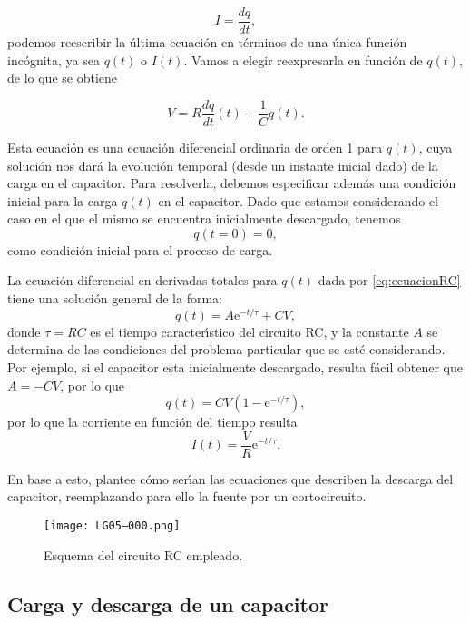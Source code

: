 \documentclass[laboratorio]{guia}
\begin{document}
$$ I = \frac{dq}{dt}, $$
podemos reescribir la \'ultima ecuaci\'on en t\'erminos de una \'unica
funci\'on inc\'ognita, ya sea $q(t)$ o $I(t)$. Vamos a elegir reexpresarla en
funci\'on de $q(t)$, de lo que se obtiene

\begin{equation}
    V = R \frac{dq}{dt}(t) + \frac{1}{C} q(t).
    \label{eq:ecuacionRC}
\end{equation}

Esta ecuaci\'on es una ecuaci\'on diferencial ordinaria de orden 1 para $q(t)$, 
cuya soluci\'on nos dar\'a la evoluci\'on temporal (desde un instante inicial
dado) de la carga en el capacitor. 
Para resolverla, debemos especificar adem\'as una condici\'on inicial para la 
carga $q(t)$ en el capacitor. Dado que estamos considerando el caso en el que
el mismo se encuentra inicialmente descargado, tenemos
\begin{equation}
    q(t=0) = 0,
\end{equation}
como condici\'on inicial para el proceso de carga. 

La ecuaci\'on diferencial en derivadas totales para $q(t)$ dada por
\eqref{eq:ecuacionRC} tiene una soluci\'on general de la forma:
\begin{equation}
    q(t) = A \text{e}^{-t/\tau} + CV,
\end{equation}
donde $\tau = RC$ es el tiempo caracter\'\i stico del circuito RC, y la
constante $A$ se determina de las condiciones del problema particular que se
est\'e considerando. Por ejemplo, si el capacitor esta inicialmente descargado,
resulta f\'acil obtener que $A = -CV$, por lo que
\begin{equation*}
    q(t) = CV \left(1 - \text{e}^{-t/\tau} \right),
\end{equation*}
por lo que la corriente en funci\'on del tiempo resulta
\begin{equation*}
    I(t) = \frac{V}{R} \text{e}^{-t/\tau}.
\end{equation*}

En base a esto, plantee c\'omo ser\'\i an las ecuaciones que describen la
descarga del capacitor, reemplazando para ello la fuente por un cortocircuito.

\begin{figure}[t!]
    \centering
    \texttt{[image: LG05--000.png]}
    \caption{Esquema del circuito RC empleado.}
    \label{fig:circuitoRC}
\end{figure}

\subsection{Carga y descarga de un capacitor}
\end{document}
